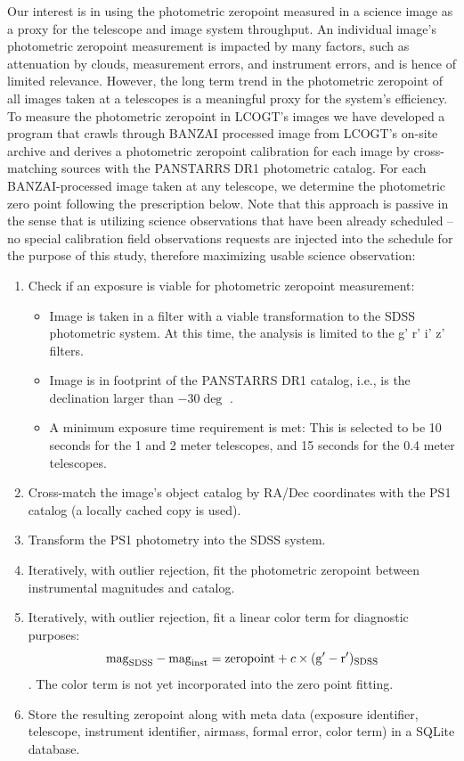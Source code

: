 \documentclass[draft]{spieman}
\begin{document}
Our interest is in using the photometric zeropoint measured in a science image as a proxy for the
telescope and image system throughput. An individual image's photometric zeropoint measurement is
impacted by many factors, such as attenuation by clouds, measurement errors, and instrument errors,
and is hence of limited relevance. However, the long term trend in the photometric zeropoint of all
images taken at a telescopes is a meaningful proxy for the system's efficiency. To measure the
photometric zeropoint in LCOGT's images we have developed a program that crawls through BANZAI
processed image from LCOGT's on-site archive and derives a photometric zeropoint calibration for
each image by cross-matching sources with the PANSTARRS DR1 photometric catalog\cite{chambers2016}. 
For each BANZAI-processed image taken at any telescope, we determine the photometric zero point 
following the prescription below. Note that this approach is passive in the sense that is utilizing 
science observations that have been already scheduled -- no special calibration field observations 
requests are injected into the schedule for the purpose of this study, therefore maximizing usable 
science observation:

 
\begin{enumerate}
\item Check if an exposure is viable for photometric zeropoint measurement:
  \begin{itemize}
   \item Image is taken in a filter with a viable transformation to the SDSS
         photometric system. At this time, the analysis is limited to the g' r' i' z' filters.
   \item Image is in footprint of the PANSTARRS DR1 catalog, i.e., is the declination larger than
         $-30\deg$ .
   \item A minimum exposure time requirement is met: This is selected to be 10 seconds for the 1 and 2
        meter telescopes, and 15 seconds for the 0.4 meter telescopes.
\end{itemize}
   
\item Cross-match the image's object catalog by RA/Dec coordinates with the PS1 catalog (a locally cached
copy is used).
\item Transform the PS1 photometry into the SDSS system\cite{finkbeiner2016}.
\item Iteratively, with outlier rejection, fit the photometric zeropoint between instrumental
magnitudes and catalog.
\item Iteratively, with outlier rejection, fit a linear color term for diagnostic purposes: 
$$ {\rm mag}_{\rm SDSS} - {\rm mag}_{\rm inst} = {\rm zeropoint} + c \times ({\rm g'}-{ \rm
r'})_{\rm SDSS}$$.
 The color term is not yet incorporated into the zero point fitting.
\item Store the resulting zeropoint along with meta data (exposure identifier, telescope, instrument
identifier, airmass, formal error, color term) in a SQLite database.
\end{enumerate}
\end{document}
